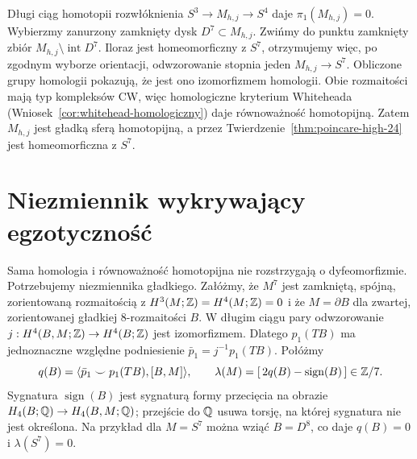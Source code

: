 Długi ciąg homotopii rozwłóknienia
$S^3\to M_{h,j}\to S^4$ daje
$\pi_1(M_{h,j})=0$.
Wybierzmy zanurzony zamknięty dysk
$D^7\subset M_{h,j}$. Zwińmy do punktu
zamknięty zbiór
$M_{h,j}\setminus\operatorname{int}D^7$.
Iloraz jest homeomorficzny z $S^7$,
otrzymujemy więc, po zgodnym wyborze
orientacji, odwzorowanie stopnia jeden
$M_{h,j}\to S^7$.
Obliczone grupy homologii pokazują,
że jest ono izomorfizmem homologii.
Obie rozmaitości mają typ kompleksów CW,
więc homologiczne kryterium Whiteheada
(Wniosek~\ref{cor:whitehead-homologiczny})
daje równoważność homotopijną.
Zatem $M_{h,j}$ jest gładką
sferą homotopijną, a przez
Twierdzenie~\ref{thm:poincare-high-24}
jest homeomorficzna z $S^7$.

\section{Niezmiennik wykrywający egzotyczność}
\label{sec:milnor-invariant-25}

Sama homologia i równoważność
homotopijna nie rozstrzygają
o dyfeomorfizmie. Potrzebujemy
niezmiennika gładkiego.
Załóżmy, że $M^7$ jest
zamkniętą, spójną, zorientowaną rozmaitością
z $H^3(M;\mathbb{Z})=H^4(M;\mathbb{Z})=0$
i że $M=\partial B$ dla
zwartej, zorientowanej gładkiej
$8$-rozmaitości $B$.
W długim ciągu pary
odwzorowanie
$j:H^4(B,M;\mathbb{Z})\to H^4(B;\mathbb{Z})$
jest izomorfizmem.
Dlatego $p_1(TB)$ ma
jednoznaczne względne podniesienie
$\bar p_1=j^{-1}p_1(TB)$.
Połóżmy
\[
 q(B)=\langle
    \bar p_1\smile p_1(TB),[B,M]\rangle,
 \qquad
 \lambda(M)=[\,2q(B)-\operatorname{sign}(B)\,]
                    \in\mathbb{Z}/7.
\]
Sygnatura $\operatorname{sign}(B)$
jest sygnaturą formy przecięcia
na obrazie
$H_4(B;\mathbb{Q})\to H_4(B,M;\mathbb{Q})$;
przejście do $\mathbb{Q}$ usuwa torsję,
na której sygnatura nie jest określona.
Na przykład dla $M=S^7$
można wziąć $B=D^8$,
co daje $q(B)=0$ i
$\lambda(S^7)=0$.

